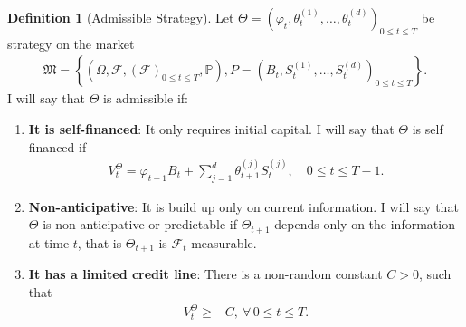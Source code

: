 \documentclass{article}
\theoremstyle{definition}
\newtheorem{definition}[theorem]{Definition}
\numberwithin{equation}{section}
\begin{document}
\begin{definition}[Admissible Strategy]
    Let $\Theta = \left(\varphi_t, \theta_t^{(1)}, \ldots, \theta_t^{(d)}\right)_{0 \leq t \leq T}$ be strategy on the market
    \begin{align}
        \mathfrak{M} =
        \left\{
            \left(
                \Omega, 
                \mathscr{F}, 
                \left(
                    \mathscr{F}
                \right)_{0 \leq t \leq T},
                \mathbb{P}
            \right),
            P =
            \left(
                B_t,
                S_t^{(1)},
                \ldots,
                S_t^{(d)}
            \right)_{0 \leq t \leq T}
        \right\}.
    \end{align}
    I will say that $\Theta$ is admissible if:
    \begin{enumerate}
        \item \textbf{It is self-financed}: It only requires initial capital.
        I will say that $\Theta$ is self financed if
        \begin{align}
            V_t^{\Theta} = \varphi_{t+1}B_t + \sum_{j=1}^d \theta_{t+1}^{(j)}S_t^{(j)}, \quad 0 \leq t \leq T-1. 
        \end{align}
        \item \textbf{Non-anticipative}: It is build up only on current information.
        I will say that $\Theta$ is non-anticipative or predictable if $\Theta_{t+1}$ depends only on the information at time $t$, that is $\Theta_{t+1}$ is $\mathscr{F}_t$-measurable.
        \item \textbf{It has a limited credit line}: There is a non-random constant $C > 0$, such that
        \begin{align}
            V_t^{\Theta} \geq -C, \ \forall \, 0 \leq t \leq T.
        \end{align}
    \end{enumerate}
\end{definition}
\end{document}

